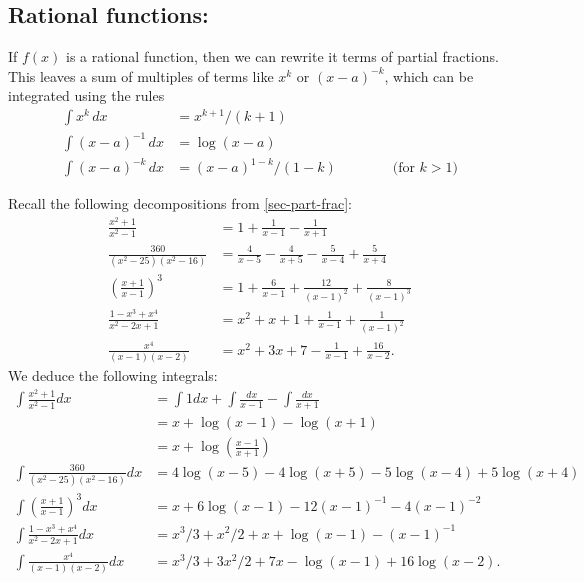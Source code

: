 \documentclass[a4paper]{book}
\renewcommand{\:}{\colon}
\theoremstyle{definition}
\begin{document}
\subsection{Rational functions:}
\label{subsec-rational-int}

If $f(x)$ is a rational function, then we can rewrite it terms of
partial fractions.  This leaves a sum of multiples of terms like $x^k$
or $(x-a)^{-k}$, which can be integrated using the rules 
\begin{align*}
 \int x^k\,dx &= x^{k+1}/(k+1) \\
 \int (x-a)^{-1}\, dx &= \log(x-a) \\
 \int (x-a)^{-k}\, dx &= (x-a)^{1-k}/(1-k) 
   \hspace{4em} \text{(for $k>1$)} 
\end{align*}

Recall the following decompositions from
\autoref{sec-part-frac}:
\begin{align*}
  \frac{x^2+1}{x^2-1}
   &= 1 + \frac{1}{x-1} - \frac{1}{x+1} \\
  \frac{360}{(x^2-25)(x^2-16)}
   &= \frac{4}{x-5} - \frac{4}{x+5} - \frac{5}{x-4} + \frac{5}{x+4} \\
  \left(\frac{x+1}{x-1}\right)^3
   &= 1 + \frac{6}{x-1} + \frac{12}{(x-1)^2} + \frac{8}{(x-1)^3} \\
  \frac{1-x^3+x^4}{x^2-2x+1}
   &= x^2 + x + 1 + \frac{1}{x-1} + \frac{1}{(x-1)^2} \\
  \frac{x^4}{(x-1)(x-2)}
   &= x^2 + 3x + 7 - \frac{1}{x-1} + \frac{16}{x-2}.
\end{align*}
We deduce the following integrals:
\begin{align*}
  \int\frac{x^2+1}{x^2-1}dx
   &= \int 1 dx + \int \frac{dx}{x-1} - \int\frac{dx}{x+1} \\
   &= x + \log(x-1) - \log(x+1) \\
   &= x + \log\left(\frac{x-1}{x+1}\right) \\
  \int\frac{360}{(x^2-25)(x^2-16)}dx
   &= 4\log(x-5) - 4\log(x+5) - 5\log(x-4) + 5\log(x+4) \\
  \int\left(\frac{x+1}{x-1}\right)^3 dx
   &= x + 6\log(x-1) - 12(x-1)^{-1} - 4(x-1)^{-2} \\
  \int\frac{1-x^3+x^4}{x^2-2x+1} dx
   &= x^3/3 + x^2/2 + x + \log(x-1) - (x-1)^{-1} \\
  \int\frac{x^4}{(x-1)(x-2)} dx
   &= x^3/3 + 3x^2/2 + 7x - \log(x-1) + 16\log(x-2).
\end{align*}
\end{document}
